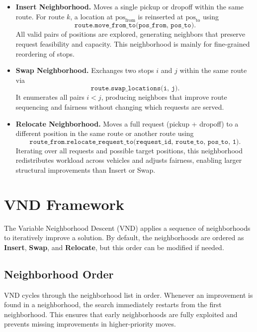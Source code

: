\documentclass[a4paper]{scrartcl}
\begin{document}
\begin{itemize}
    \item \textbf{Insert Neighborhood.}  
    Moves a single pickup or dropoff within the same route. For route $k$, a location at $\text{pos}_{\text{from}}$ is reinserted at $\text{pos}_{\text{to}}$ using 
    $$
        \texttt{route.move\_from\_to(pos\_from, pos\_to)}.
    $$
    All valid pairs of positions are explored, generating neighbors that preserve request feasibility and capacity. This neighborhood is mainly for fine-grained reordering of stops.

    \item \textbf{Swap Neighborhood.}  
    Exchanges two stops $i$ and $j$ within the same route via
    $$
        \texttt{route.swap\_locations(i, j)}.
    $$
    It enumerates all pairs $i<j$, producing neighbors that improve route sequencing and fairness without changing which requests are served.

    \item \textbf{Relocate Neighborhood.}  
    Moves a full request (pickup + dropoff) to a different position in the same route or another route using
    $$
        \texttt{route\_from.relocate\_request\_to(request\_id, route\_to, pos\_to, 1)}.
    $$
    Iterating over all requests and possible target positions, this neighborhood redistributes workload across vehicles and adjusts fairness, enabling larger structural improvements than Insert or Swap.
\end{itemize}



\section{VND Framework}

The Variable Neighborhood Descent (VND) applies a sequence of neighborhoods to iteratively improve a solution. By default, the neighborhoods are ordered as \textbf{Insert}, \textbf{Swap}, and \textbf{Relocate}, but this order can be modified if needed.

\subsection{Neighborhood Order}
VND cycles through the neighborhood list in order. Whenever an improvement is found in a neighborhood, the search immediately restarts from the first neighborhood. This ensures that early neighborhoods are fully exploited and prevents missing improvements in higher-priority moves.
\end{document}
